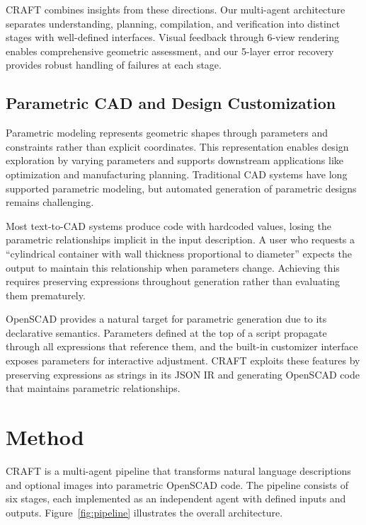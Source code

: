 \documentclass[5p,twocolumn,10pt,times]{elsarticle}
\begin{document}
CRAFT combines insights from these directions. Our multi-agent architecture separates understanding, planning, compilation, and verification into distinct stages with well-defined interfaces. Visual feedback through 6-view rendering enables comprehensive geometric assessment, and our 5-layer error recovery provides robust handling of failures at each stage.

\subsection{Parametric CAD and Design Customization}

Parametric modeling represents geometric shapes through parameters and constraints rather than explicit coordinates. This representation enables design exploration by varying parameters and supports downstream applications like optimization and manufacturing planning. Traditional CAD systems have long supported parametric modeling, but automated generation of parametric designs remains challenging.

Most text-to-CAD systems produce code with hardcoded values, losing the parametric relationships implicit in the input description. A user who requests a ``cylindrical container with wall thickness proportional to diameter'' expects the output to maintain this relationship when parameters change. Achieving this requires preserving expressions throughout generation rather than evaluating them prematurely.

OpenSCAD provides a natural target for parametric generation due to its declarative semantics. Parameters defined at the top of a script propagate through all expressions that reference them, and the built-in customizer interface exposes parameters for interactive adjustment. CRAFT exploits these features by preserving expressions as strings in its JSON IR and generating OpenSCAD code that maintains parametric relationships.


\section{Method}
\label{sec:method}
CRAFT is a multi-agent pipeline that transforms natural language descriptions and optional images into parametric OpenSCAD code. The pipeline consists of six stages, each implemented as an independent agent with defined inputs and outputs. Figure~\ref{fig:pipeline} illustrates the overall architecture.
\end{document}
